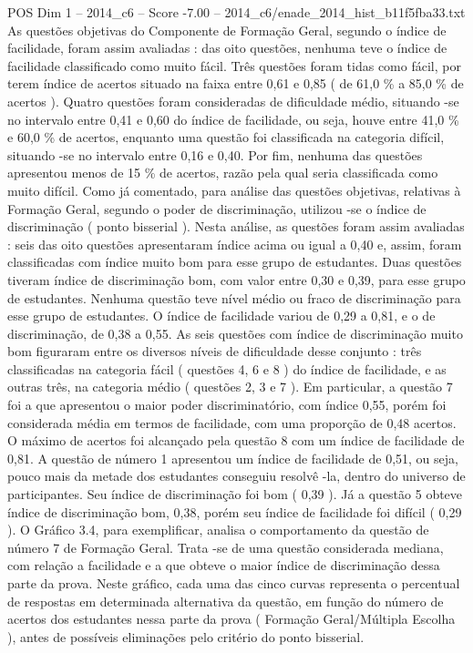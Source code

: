 \begin{textsample}{POS Dim 1 – 2014\_c6 – Score -7.00 – 2014\_c6/enade\_2014\_hist\_b11f5fba33.txt}
As questões objetivas do Componente de Formação Geral, segundo o índice de facilidade, foram assim avaliadas : das oito questões, nenhuma teve o índice de facilidade classificado como muito fácil.
Três questões foram tidas como fácil, por terem índice de acertos situado na faixa entre 0,61 e 0,85 ( de 61,0 \% a 85,0 \% de acertos ).
Quatro questões foram consideradas de dificuldade médio, situando -se no intervalo entre 0,41 e 0,60 do índice de facilidade, ou seja, houve entre 41,0 \% e 60,0 \% de acertos, enquanto uma questão foi classificada na categoria difícil, situando -se no intervalo entre 0,16 e 0,40.
Por fim, nenhuma das questões apresentou menos de 15 \% de acertos, razão pela qual seria classificada como muito difícil.
Como já comentado, para análise das questões objetivas, relativas à Formação Geral, segundo o poder de discriminação, utilizou -se o índice de discriminação ( ponto bisserial ).
Nesta análise, as questões foram assim avaliadas : seis das oito questões apresentaram índice acima ou igual a 0,40 e, assim, foram classificadas com índice muito bom para esse grupo de estudantes.
Duas questões tiveram índice de discriminação bom, com valor entre 0,30 e 0,39, para esse grupo de estudantes.
Nenhuma questão teve nível médio ou fraco de discriminação para esse grupo de estudantes.
O índice de facilidade variou de 0,29 a 0,81, e o de discriminação, de 0,38 a 0,55.
As seis questões com índice de discriminação muito bom figuraram entre os diversos níveis de dificuldade desse conjunto : três classificadas na categoria fácil ( questões 4, 6 e 8 ) do índice de facilidade, e as outras três, na categoria médio ( questões 2, 3 e 7 ).
Em particular, a questão 7 foi a que apresentou o maior poder discriminatório, com índice 0,55, porém foi considerada média em termos de facilidade, com uma proporção de 0,48 acertos.
O máximo de acertos foi alcançado pela questão 8 com um índice de facilidade de 0,81.
A questão de número 1 apresentou um índice de facilidade de 0,51, ou seja, pouco mais da metade dos estudantes conseguiu resolvê -la, dentro do universo de participantes.
Seu índice de discriminação foi bom ( 0,39 ).
Já a questão 5 obteve índice de discriminação bom, 0,38, porém seu índice de facilidade foi difícil ( 0,29 ).
O Gráfico 3.4, para exemplificar, analisa o comportamento da questão de número 7 de Formação Geral.
Trata -se de uma questão considerada mediana, com relação a facilidade e a que obteve o maior índice de discriminação dessa parte da prova.
Neste gráfico, cada uma das cinco curvas representa o percentual de respostas em determinada alternativa da questão, em função do número de acertos dos estudantes nessa parte da prova ( Formação Geral/Múltipla Escolha ), antes de possíveis eliminações pelo critério do ponto bisserial.

\end{textsample}
